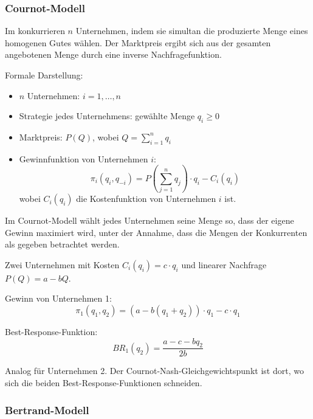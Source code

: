 \subsubsection*{Cournot-Modell}

\begin{definition}
Im  konkurrieren $n$ Unternehmen, indem sie simultan die produzierte Menge eines homogenen Gutes wählen. Der Marktpreis ergibt sich aus der gesamten angebotenen Menge durch eine inverse Nachfragefunktion.

Formale Darstellung:
\begin{itemize}
    \item $n$ Unternehmen: $i = 1, \dots, n$
    \item Strategie jedes Unternehmens: gewählte Menge $q_i \geq 0$
    \item Marktpreis: $P(Q)$, wobei $Q = \sum_{i=1}^n q_i$
    \item Gewinnfunktion von Unternehmen $i$:
    \[
    \pi_i(q_i, q_{-i}) = P\left( \sum_{j=1}^n q_j \right) \cdot q_i - C_i(q_i)
    \]
    wobei $C_i(q_i)$ die Kostenfunktion von Unternehmen $i$ ist.
\end{itemize}
\end{definition}

\noindent
Im Cournot-Modell wählt jedes Unternehmen seine Menge so, dass der eigene Gewinn maximiert wird, unter der Annahme, dass die Mengen der Konkurrenten als gegeben betrachtet werden.

\begin{example}
Zwei Unternehmen mit Kosten $C_i(q_i) = c \cdot q_i$ und linearer Nachfrage $P(Q) = a - bQ$.

Gewinn von Unternehmen 1:
\[
\pi_1(q_1, q_2) = (a - b(q_1 + q_2)) \cdot q_1 - c \cdot q_1
\]

Best-Response-Funktion:
\[
BR_1(q_2) = \frac{a - c - b q_2}{2b}
\]

Analog für Unternehmen 2.
Der Cournot-Nash-Gleichgewichtspunkt ist dort, wo sich die beiden Best-Response-Funktionen schneiden.
\end{example}

\vspace{0.5cm}

\subsubsection*{Bertrand-Modell}

